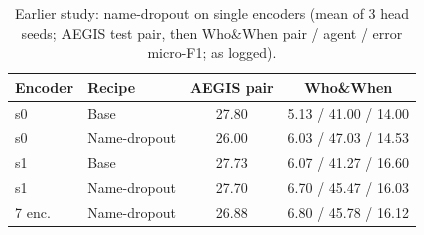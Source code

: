 \begin{table}[t]
\caption{Earlier study: name-dropout on single encoders (mean of 3 head seeds; AEGIS test pair, then Who\&When pair / agent / error micro-F1; as logged).}
\label{tab:namedrop}
\centering\footnotesize\setlength{\tabcolsep}{3pt}
\begin{tabular}{@{}llcc@{}}
\toprule
Encoder & Recipe & AEGIS pair & Who\&When \\
\midrule
s0 & Base & 27.80 & 5.13 / 41.00 / 14.00 \\
s0 & Name-dropout & 26.00 & 6.03 / 47.03 / 14.53 \\
s1 & Base & 27.73 & 6.07 / 41.27 / 16.60 \\
s1 & Name-dropout & 27.70 & 6.70 / 45.47 / 16.03 \\
7 enc. & Name-dropout & 26.88 & 6.80 / 45.78 / 16.12 \\
\bottomrule
\end{tabular}
\end{table}
